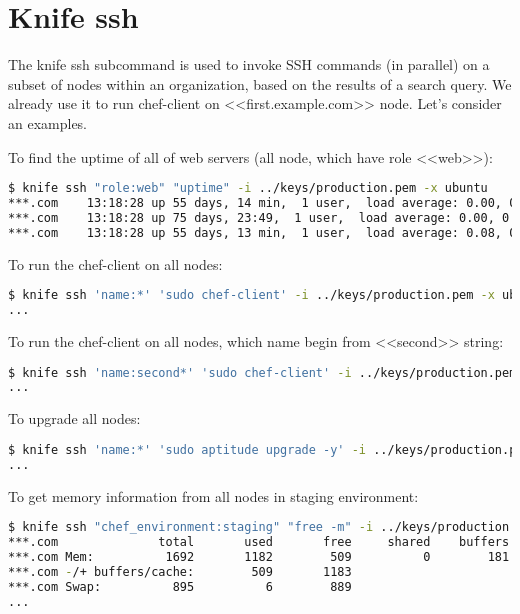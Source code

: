 \section{Knife ssh}
\label{sec:server-knife-ssh}

The knife ssh subcommand is used to invoke SSH commands (in parallel) on a subset of nodes within an organization, based on the results of a search query. We already use it to run chef-client on <<first.example.com>> node. Let's consider an examples.

To find the uptime of all of web servers (all node, which have role <<web>>):

\begin{lstlisting}[language=Bash,label=lst:my-server-cloud-knife-ssh1]
$ knife ssh "role:web" "uptime" -i ../keys/production.pem -x ubuntu
***.com    13:18:28 up 55 days, 14 min,  1 user,  load average: 0.00, 0.01, 0.05
***.com    13:18:28 up 75 days, 23:49,  1 user,  load average: 0.00, 0.01, 0.05
***.com    13:18:28 up 55 days, 13 min,  1 user,  load average: 0.08, 0.03, 0.05
\end{lstlisting}

To run the chef-client on all nodes:

\begin{lstlisting}[language=Bash,label=lst:my-server-cloud-knife-ssh2]
$ knife ssh 'name:*' 'sudo chef-client' -i ../keys/production.pem -x ubuntu
...
\end{lstlisting}

To run the chef-client on all nodes, which name begin from <<second>> string:

\begin{lstlisting}[language=Bash,label=lst:my-server-cloud-knife-ssh3]
$ knife ssh 'name:second*' 'sudo chef-client' -i ../keys/production.pem -x ubuntu
...
\end{lstlisting}

To upgrade all nodes:

\begin{lstlisting}[language=Bash,label=lst:my-server-cloud-knife-ssh4]
$ knife ssh 'name:*' 'sudo aptitude upgrade -y' -i ../keys/production.pem -x ubuntu
...
\end{lstlisting}

To get memory information from all nodes in staging environment:

\begin{lstlisting}[language=Bash,label=lst:my-server-cloud-knife-ssh5]
$ knife ssh "chef_environment:staging" "free -m" -i ../keys/production.pem -x ubuntu
***.com              total       used       free     shared    buffers     cached
***.com Mem:          1692       1182        509          0        181        491
***.com -/+ buffers/cache:        509       1183
***.com Swap:          895          6        889
...
\end{lstlisting}


